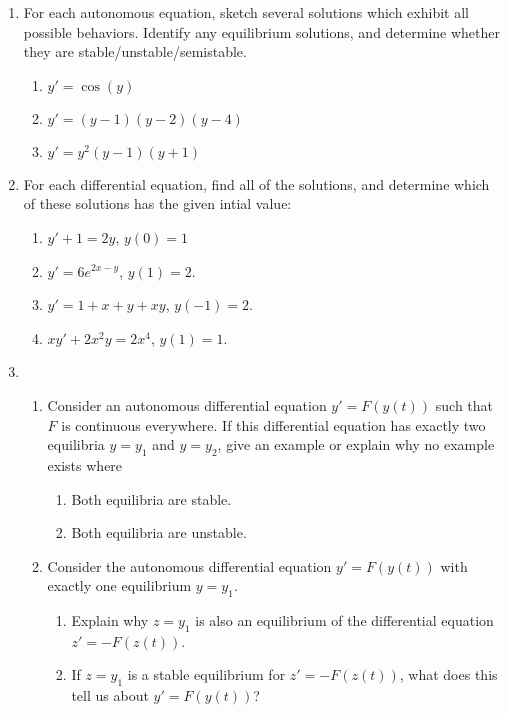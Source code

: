 \documentclass[10pt,psamsfonts,reqno,oneside,letterpaper]{amsart}
\begin{document}
\begin{enumerate}
	\item For each autonomous equation, sketch several solutions which exhibit all possible behaviors.  Identify any equilibrium solutions, and determine whether they are stable/unstable/semistable.
	\begin{enumerate}
		\item $y' = \cos(y)$ \\
		\item$y' = (y-1)(y-2)(y-4)$ \\
		\item $y' = y^2(y-1)(y+1)$ \\
	\end{enumerate}
	
	\item For each differential equation, find all of the solutions, and determine which of these solutions has the given intial value:
	\begin{enumerate}
		\item $y' + 1 = 2y$, \; $y(0) = 1$
		\item $y' = 6 e^{2x-y}$,\; $y(1) = 2$.
		\item $y' = 1 + x + y + xy$, \; $y(-1) = 2$.
		\item $xy'+2x^2y=2x^4$, \; $y(1)=1$.
	\end{enumerate}
	\item \begin{enumerate}
		\item  Consider an autonomous differential equation $y'=F(y(t))$ such that $F$ is continuous everywhere. If this differential equation has exactly two equilibria $y=y_1$ and $y=y_2$, give an example or explain why no example exists where
	\begin{enumerate}
		\item Both equilibria are stable.

		
		\item Both equilibria are unstable.
	
	\end{enumerate}
	
	\item Consider the autonomous differential equation $y'=F(y(t))$ with exactly one equilibrium $y=y_1$.
	\begin{enumerate}
		\item Explain why $z=y_1$ is also an equilibrium of the differential equation $z'=-F(z(t))$.

		
		\item If $z=y_1$ is a stable equilibrium for $z'=-F(z(t))$, what does this tell us about $y'=F(y(t))$?


\end{enumerate}
\end{enumerate}
\end{enumerate}
\end{document}
